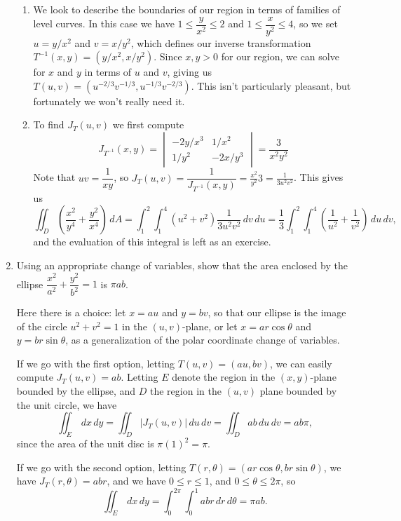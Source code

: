 \documentclass[letterpaper,12pt]{article}
\begin{document}
\begin{enumerate}
\begin{enumerate}
 \item We look to describe the boundaries of our region in terms of families of level curves. In this case we have $1\leq \dfrac{y}{x^2}\leq 2$ and $1\leq \dfrac{x}{y^2}\leq 4$, so we set $u=y/x^2$ and $v=x/y^2$, which defines our inverse transformation $T^{-1}(x,y) = (y/x^2, x/y^2)$. Since $x,y>0$ for our region, we can solve for $x$ and $y$ in terms of $u$ and $v$, giving us $T(u,v) = (u^{-2/3}v^{-1/3}, u^{-1/3}v^{-2/3})$. This isn't particularly pleasant, but fortunately we won't really need it.

 \item To find $J_T(u,v)$ we first compute
\[
 J_{T^{-1}}(x,y) = \begin{vmatrix} -2y/x^3 & 1/x^2\\ 1/y^2 & -2x/y^3\end{vmatrix} = \frac{3}{x^2y^2}
\]
Note that $uv = \dfrac{1}{xy}$, so $J_T(u,v) = \dfrac{1}{J_{T^{-1}}(x,y)} = \frac{x^2}{y^2}{3} = \frac{1}{3u^2v^2}$. This gives us
\[
 \iint_D\left(\frac{x^2}{y^4}+\frac{y^2}{x^4}\right)\,dA = \int_1^2\int_1^4 (u^2+v^2)\frac{1}{3u^2v^2}\,dv\,du = \frac{1}{3}\int_1^2\int_1^4\left(\frac{1}{u^2}+\frac{1}{v^2}\right)\,du\,dv,
\]
and the evaluation of this integral is left as an exercise.
\end{enumerate}

\item Using an appropriate change of variables, show that the area enclosed by the ellipse $\dfrac{x^2}{a^2}+\dfrac{y^2}{b^2}=1$ is $\pi ab$.

\bigskip

Here there is a choice: let $x=au$ and $y=bv$, so that our ellipse is the image of the circle $u^2+v^2=1$ in the $(u,v)$-plane, or let $x=ar\cos\theta$ and $y=br\sin\theta$, as a generalization of the polar coordinate change of variables. 

If we go with the first option, letting $T(u,v) = (au,bv)$, we can easily compute $J_T(u,v) = ab$. Letting $E$ denote the region in the $(x,y)$-plane bounded by the ellipse, and $D$ the region in the $(u,v)$ plane bounded by the unit circle, we have
\[
 \iint_E \,dx\,dy = \iint_D \lvert J_T(u,v)\rvert \,du\,dv = \iint_D ab\,du\,dv = ab\pi,
\]
since the area of the unit disc is $\pi(1)^2=\pi$.

If we go with the second option, letting $T(r,\theta) = (ar\cos\theta, br\sin\theta)$, we have $J_T(r,\theta) = abr$, and we have $0\leq r\leq 1$, and $0\leq \theta\leq 2\pi$, so
\[
 \iint_E \,dx\,dy = \int_0^{2\pi}\int_0^1 abr \,dr\,d\theta = \pi ab.
\]


\end{enumerate}
\end{document}
